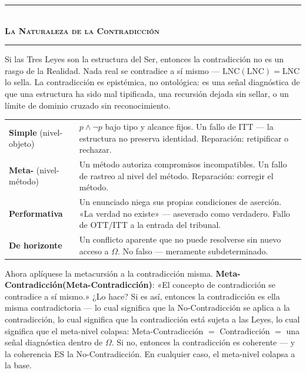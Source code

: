 \documentclass[10pt, openany, oneside]{book}
\renewcommand{\normalsize}{\fontsize{10}{13}\selectfont}
\renewcommand{\footnotesize}{\fontsize{8.5}{11}\selectfont}
\begin{document}

\begin{center}
    \rule{0.3\textwidth}{0.4pt}\\[0.5em]
    {\normalsize\bfseries\scshape La Naturaleza de la Contradicción}\\[0.3em]
    \rule{0.3\textwidth}{0.4pt}
\end{center}

\vspace{1em}

\noindent Si las Tres Leyes son la estructura del Ser, entonces la contradicción no es un rasgo de la Realidad. Nada real se contradice a sí mismo --- $\text{LNC}(\text{LNC}) = \text{LNC}$ lo sella. La contradicción es epistémica, no ontológica: es una señal diagnóstica de que una estructura ha sido mal tipificada, una recursión dejada sin sellar, o un límite de dominio cruzado sin reconocimiento.

\vspace{0.5em}

{\footnotesize
\noindent\begin{tabular}{p{3cm} p{}}
\textbf{Simple} (nivel-objeto) & $p \wedge \neg p$ bajo tipo y alcance fijos. Un fallo de ITT --- la estructura no preserva identidad. Reparación: retipificar o rechazar. \\[0.3em]
\textbf{Meta-} (nivel-método) & Un método autoriza compromisos incompatibles. Un fallo de rastreo al nivel del método. Reparación: corregir el método. \\[0.3em]
\textbf{Performativa} & Un enunciado niega sus propias condiciones de aserción. «La verdad no existe» --- aseverado como verdadero. Fallo de OTT/ITT a la entrada del tribunal. \\[0.3em]
\textbf{De horizonte} & Un conflicto aparente que no puede resolverse sin nuevo acceso a $\Omega$. No falso --- meramente subdeterminado. \\[0.3em]
\end{tabular}
}

\vspace{0.8em}

\noindent Ahora aplíquese la metacursión a la contradicción misma. \textbf{Meta-Contradicción(Meta-Contradicción)}: «El concepto de contradicción se contradice a sí mismo.» ¿Lo hace? Si es así, entonces la contradicción es ella misma contradictoria --- lo cual significa que la No-Contradicción se aplica a la contradicción, lo cual significa que la contradicción está sujeta a las Leyes, lo cual significa que el meta-nivel colapsa: Meta-Contradicción $=$ Contradicción $=$ una señal diagnóstica dentro de $\Omega$. Si no, entonces la contradicción es coherente --- y la coherencia ES la No-Contradicción. En cualquier caso, el meta-nivel colapsa a la base.
\end{document}
